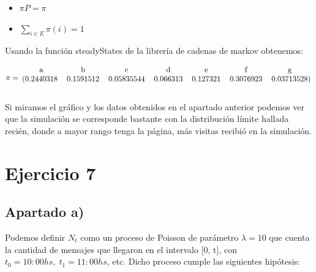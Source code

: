 \documentclass[11pt]{article}
\begin{document}
\begin{itemize}
  \item $\pi P = \pi$
  \item $\displaystyle\sum_{i \in E} \pi(i) = 1$
\end{itemize}

Usando la función steadyStates de la librería de cadenas de markov obtenemos:

\begin{equation*}
  \pi = 
  \begin{blockarray}{ccccccc}
    \text{a} & \text{b} & \text{c} & \text{d} & \text{e} & \text{f} & \text{g} \\
    \begin{block}{(ccccccc)}
      0.2440318 & 0.1591512 & 0.05835544 & 0.066313 & 0.127321 & 0.3076923 & 0.03713528 \\
    \end{block}
  \end{blockarray}
\end{equation*}

Si miramos el gráfico y los datos obtenidos en el apartado anterior podemos
ver que la simulación se corresponde bastante con la distribución límite hallada
recién, donde a mayor rango tenga la página, más visitas recibió en la simulación.


\section{Ejercicio 7}

\subsection*{Apartado a)}

Podemos definir $N_t$ como un proceso de Poisson de parámetro $\lambda = 10$ que
cuenta la cantidad de mensajes que llegaron en el intervalo [0, t], con $t_0 = 10:00hs, \;
t_1 = 11:00hs$, etc. Dicho proceso cumple las siguientes hipótesis:
\end{document}
